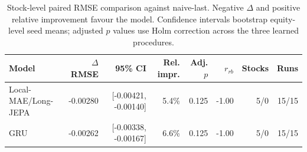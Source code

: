 \begin{table}[t]
\centering
\small
\caption{Stock-level paired RMSE comparison against naive-last. Negative $\Delta$ and positive relative improvement favour the model. Confidence intervals bootstrap equity-level seed means; adjusted $p$ values use Holm correction across the three learned procedures.}
\label{tab:paired_rmse_naive}
\begin{tabular}{lrrrrrrr}
\toprule
Model & $\Delta$RMSE & 95\% CI & Rel. impr. & Adj. $p$ & $r_{rb}$ & Stocks & Runs \\
\midrule
Local-MAE/Long-JEPA & -0.00280 & [-0.00421, -0.00140] & 5.4\% & 0.125 & -1.00 & 5/0 & 15/15 \\
GRU & -0.00262 & [-0.00338, -0.00167] & 6.6\% & 0.125 & -1.00 & 5/0 & 15/15 \\
\bottomrule
\end{tabular}
\end{table}
